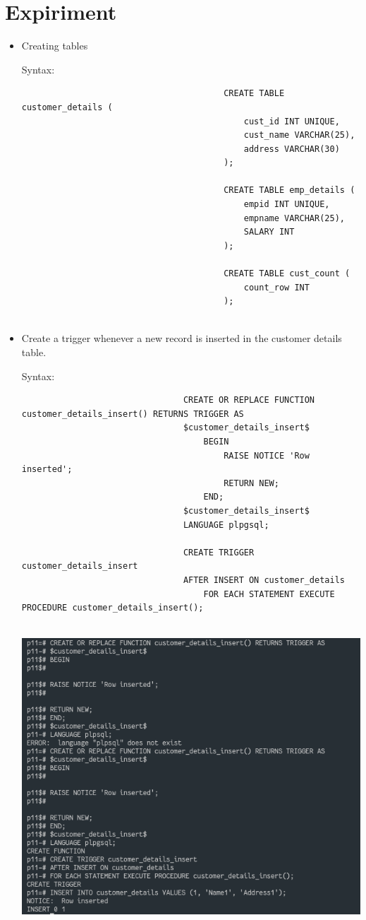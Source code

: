 \documentclass[13pt,oneside]{book}
\begin{document}
								\section*{Expiriment}
								\begin{itemize}
									\item
									Creating tables
									 
									Syntax:
									\begin{verbatim}
										CREATE TABLE customer_details (
											cust_id INT UNIQUE,
											cust_name VARCHAR(25),
											address VARCHAR(30)
										);
										
										CREATE TABLE emp_details (
											empid INT UNIQUE,
											empname VARCHAR(25),
											SALARY INT
										);
										
										CREATE TABLE cust_count (
											count_row INT
										);
									
									\end{verbatim}
									
									
									\item
									Create a trigger whenever a new record is inserted in the customer details
									table.
								
									Syntax:
									\begin{verbatim}
								CREATE OR REPLACE FUNCTION customer_details_insert() RETURNS TRIGGER AS
								$customer_details_insert$
									BEGIN
										RAISE NOTICE 'Row inserted';
										RETURN NEW;
									END;
								$customer_details_insert$
								LANGUAGE plpgsql;
								
								CREATE TRIGGER customer_details_insert
								AFTER INSERT ON customer_details
									FOR EACH STATEMENT EXECUTE PROCEDURE customer_details_insert();
									
									\end{verbatim}
									\includegraphics[]{img/p10/ss1.png}
									

\end{itemize}
\end{document}
